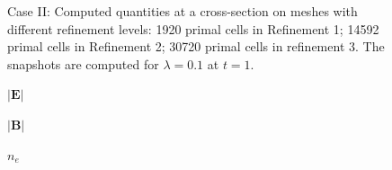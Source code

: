 \documentclass{article}
\begin{document}
\begin{figure}
\begin{minipage}{0.9\textwidth}
    \end{minipage}
    \caption{Case II: Computed quantities at a cross-section on meshes with different
      refinement levels: 1920 primal cells in Refinement 1; 14592 primal cells in
      Refinement 2; 30720 primal cells in refinement 3. The snapshots are computed for
      \colorbox{yellow!30}{$\lambda = 0.1$} at $t = 1$.}
    \label{fig:grid_study_3d_clip_lambda-1e-1}
\end{figure}

\begin{figure}
    \centering
    \begin{minipage}{0.0\textwidth}
    \Large
    \vspace{0.4cm}
    $\mathbf{|E|}$
    
    \vspace{2.2cm}
    $\mathbf{|B|}$
    
    \vspace{2.2cm}
    $n_e$
    

\end{minipage}
\end{figure}
\end{document}
